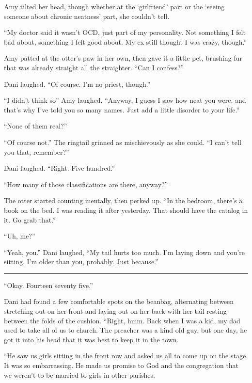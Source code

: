 Amy tilted her head, though whether at the `girlfriend' part or the `seeing someone about chronic neatness' part, she couldn't tell.

``My doctor said it wasn't OCD, just part of my personality. Not something I felt bad about, something I felt good about. My ex still thought I was crazy, though.''

Amy patted at the otter's paw in her own, then gave it a little pet, brushing fur that was already straight all the straighter. ``Can I confess?''

Dani laughed. ``Of course. I'm no priest, though.''

``I didn't think so'' Amy laughed. ``Anyway, I guess I saw how neat you were, and that's why I've told you so many names. Just add a little disorder to your life.''

``None of them real?''

``Of course not.'' The ringtail grinned as mischievously as she could. ``I can't tell you that, remember?''

Dani laughed. ``Right. Five hundred.''

``How many of those classifications are there, anyway?''

The otter started counting mentally, then perked up. ``In the bedroom, there's a book on the bed. I was reading it after yesterday. That should have the catalog in it. Go grab that.''

``Uh, me?''

``Yeah, you.'' Dani laughed, ``My tail hurts too much. I'm laying down and you're sitting. I'm older than you, probably. Just because.''

\begin{center}\rule{0.5\linewidth}{\linethickness}\end{center}

``Okay. Fourteen seventy five.''

Dani had found a few comfortable spots on the beanbag, alternating between stretching out on her front and laying out on her back with her tail resting between the folds of the cushion. ``Right, hmm. Back when I was a kid, my dad used to take all of us to church. The preacher was a kind old guy, but one day, he got it into his head that it was best to keep it in the town.

``He saw us girls sitting in the front row and asked us all to come up on the stage. It was so embarrassing. He made us promise to God and the congregation that we weren't to be married to girls in other parishes.

